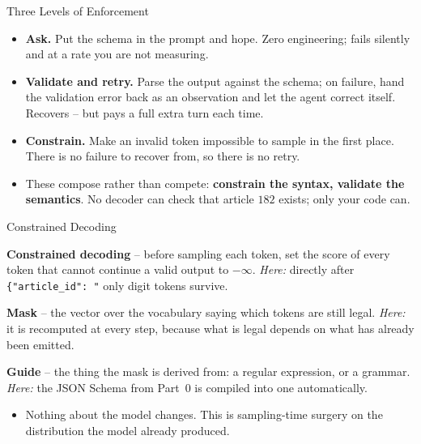 \begin{frame}{Three Levels of Enforcement}
\begin{itemize}
  \item \textbf{Ask.} Put the schema in the prompt and hope. Zero engineering; fails silently and at a rate you are not measuring.
  \pause
  \item \textbf{Validate and retry.} Parse the output against the schema; on failure, hand the validation error back as an observation and let the agent correct itself. Recovers -- but pays a full extra turn each time.
  \pause
  \item \textbf{Constrain.} Make an invalid token impossible to sample in the first place. There is no failure to recover from, so there is no retry.
  \pause
  \item These compose rather than compete: \textbf{constrain the syntax, validate the semantics}. No decoder can check that article $182$ exists; only your code can.
\end{itemize}
\end{frame}

\begin{frame}{Constrained Decoding}
\begin{rldefinition}
\textbf{Constrained decoding} -- before sampling each token, set the score of every token that cannot continue a valid output to $-\infty$. \emph{Here:} directly after \texttt{\{"article\_id": "} only digit tokens survive.

\smallskip
\textbf{Mask} -- the vector over the vocabulary saying which tokens are still legal. \emph{Here:} it is recomputed at every step, because what is legal depends on what has already been emitted.

\smallskip
\textbf{Guide} -- the thing the mask is derived from: a regular expression, or a grammar. \emph{Here:} the JSON Schema from Part~0 is compiled into one automatically.
\end{rldefinition}
\pause
\begin{itemize}
  \item Nothing about the model changes. This is sampling-time surgery on the distribution the model already produced.
\end{itemize}
\end{frame}

